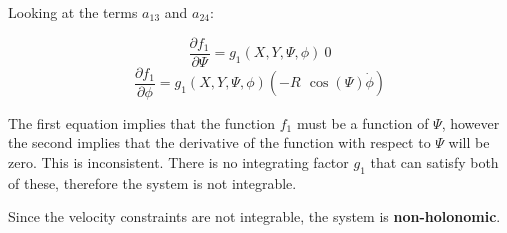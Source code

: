 \documentclass[12pt, letterpaper]{../assignment}
\begin{document}


Looking at the terms $a_{13}$ and $a_{24}$:

$$ \frac{\partial f_1}{\partial \Psi} = g_1\left(X, Y, \Psi , \phi\right)\ 0$$
$$ \frac{\partial f_1}{\partial \phi} = g_1\left(X, Y, \Psi , \phi\right) \left(-R\ \,\cos\left(\Psi\right) \dot{\phi}\right) $$

The first equation implies that the function $f_1$ must be a function of $\Psi$, however the second implies that the derivative of the function with respect to $\Psi$ will be zero.
This is inconsistent.
There is no integrating factor $g_1$ that can satisfy both of these, therefore the system is not integrable.

\begin{answer}
Since the velocity constraints are not integrable, the system is \textbf{non-holonomic}.
\end{answer}


\end{document}
